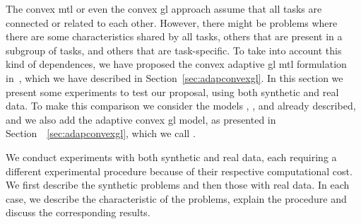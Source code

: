 The convex \acrshort{mtl} or even the convex \acrshort{gl} approach assume that all tasks are connected or related to each other. However, there might be problems where there are some characteristics shared by all tasks, others that are present in a subgroup of tasks, and others that are task-specific.
%
To take into account this kind of dependences, we have proposed the convex adaptive \acrshort{gl} \acrshort{mtl} formulation in~\cite{RuizAD21_hais}, which we have described in Section~\ref{sec:adapconvexgl}.
%
In this section we present some experiments to test our proposal, using both synthetic and real data. 
%
To make this comparison we consider the models , ,  and  already described, and we also add the adaptive convex \acrshort{gl} model, as presented in Section~~\ref{sec:adapconvexgl}, which we call .
%

We conduct experiments with both synthetic and real data, each requiring a different experimental procedure because of their respective computational cost. We first describe the synthetic problems and then those with real data. In each case, we describe the characteristic of the problems, explain the procedure and discuss the corresponding results. 



